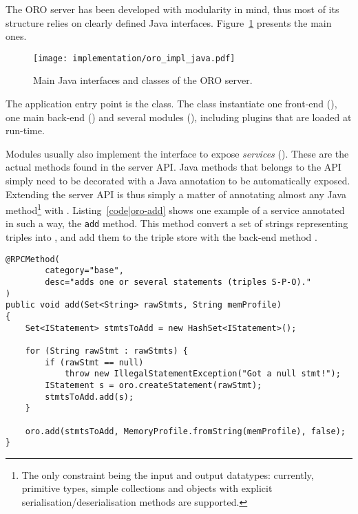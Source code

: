 The ORO server has been developed with modularity in mind, thus most of its
structure relies on clearly defined Java interfaces.
Figure~\ref{fig|oro-impl-java} presents the main ones.

\begin{figure}
    \centering
    \texttt{[image: implementation/oro\_impl\_java.pdf]}
    \caption{Main Java interfaces and classes of the ORO server.}
    \label{fig|oro-impl-java}
\end{figure}

The application entry point is the  class. The class
instantiate one front-end (), one main back-end
() and several modules (),
including plugins that are loaded at run-time.

Modules usually also implement the  interface to
expose \emph{services} (). These are the actual methods
found in the server API. Java methods that belongs to the API simply need to be
decorated with a  Java annotation to be automatically
exposed. Extending the server API is thus simply a matter of annotating almost
any Java method\footnote{The only constraint being the input and output
datatypes: currently, primitive types, simple collections and objects with
explicit serialisation/deserialisation methods are supported.} with
. Listing~\ref{code|oro-add} shows one example of a
service annotated in such a way, the {\tt add} method. This method convert a
set of strings representing triples into , and add them
to the triple store with the back-end method .

\lstset{language=java}
\begin{lstlisting}[caption=The {\tt add} method from ORO {\tt BaseModule}, 
                   label = code|oro-add, 
                   morekeywords={@RPCMethod}]
@RPCMethod(
        category="base",
        desc="adds one or several statements (triples S-P-O)."
)
public void add(Set<String> rawStmts, String memProfile)
{
    Set<IStatement> stmtsToAdd = new HashSet<IStatement>();
    
    for (String rawStmt : rawStmts) {
        if (rawStmt == null)
            throw new IllegalStatementException("Got a null stmt!");
        IStatement s = oro.createStatement(rawStmt);
        stmtsToAdd.add(s);
    }
    
    oro.add(stmtsToAdd, MemoryProfile.fromString(memProfile), false);
}
\end{lstlisting}

